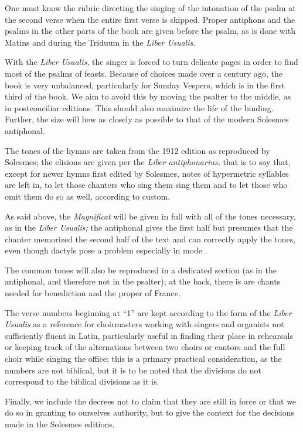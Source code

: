 \begin{enpars}
One must know the rubric directing the singing of the intonation of the psalm at the second verse when the entire first verse is skipped. Proper antiphons and the psalms in the other parts of the book are given before the psalm, as is done with Matins and during the Triduum in the \textit{Liber Usualis}.

With the \textit{Liber Usualis,} the singer is forced to turn delicate pages in order to find most of the psalms of feasts. Because of choices made over a century ago, the book is very unbalanced, particularly for Sunday Vespers, which is in the first third of the book. We aim to avoid this by moving the psalter to the middle, as in postconciliar editions. This should also maximize the life of the binding. Further, the size will hew as closely as possible to that of the modern Solesmes antiphonal.

The tones of the hymns are taken from the 1912 edition as reproduced by Solesmes; the elisions are given per the \textit{Liber antiphonarius,} that is to say that, except for newer hymns first edited by Solesmes, notes of hypermetric syllables are left in, to let those chanters who sing them sing them and to let those who omit them do so as well, according to custom.

As said above, the \textit{Magnificat} will be given in full with all of the tones necessary, as in the \textit{Liber Usualis;} the antiphonal gives the first half but presumes that the chanter memorized the second half of the text and can correctly apply the tones, even though dactyls pose a problem especially in mode .

The common tones will also be reproduced in a dedicated section (as in the antiphonal, and therefore not in the psalter); at the back, there is are chants needed for benediction and the proper of France.

The verse numbers beginning at ``1'' are kept according to the form of the \textit{Liber Usualis} as a reference for choirmasters working with singers and organists not sufficiently fluent in Latin, particularly useful in finding their place in rehearsals or keeping track of the alternations between two choirs or cantors and the full choir while singing the office; this is a primary practical consideration, as the numbers are not biblical, but it is to be noted that the divisions do not correspond to the biblical divisions as it is.

Finally, we include the decrees not to claim that they are still in force or that we do so in granting to ourselves authority, but to give the context for the decisions made in the Solesmes editions.
\end{enpars}
